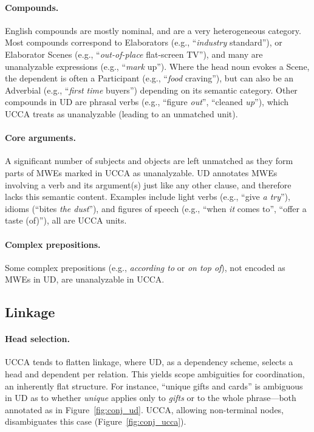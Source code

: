 \documentclass[11pt,a4paper]{article}
\begin{document}
\paragraph{Compounds.} English compounds are mostly nominal,
        and are a very heterogeneous category.
        Most compounds correspond to Elaborators (e.g., ``\textit{industry} standard''),
        or Elaborator Scenes (e.g., ``\textit{out-of-place} flat-screen TV''),
        and many are unanalyzable expressions (e.g., ``\textit{mark} up'').
        Where the head noun evokes a Scene, the dependent is often a Participant
        (e.g., ``\textit{food} craving''), but can also be an Adverbial 
        (e.g., ``\textit{first time} buyers'') depending on its semantic category.
        Other compounds in UD are phrasal verbs (e.g., ``figure \textit{out}'', ``cleaned \textit{up}''),
        which UCCA treats as unanalyzable (leading to an unmatched unit). 
            
\paragraph{Core arguments.}
      A significant number of subjects and objects are left unmatched as they
      form parts of MWEs marked in UCCA as unanalyzable. UD annotates
      MWEs involving a verb and its argument(s) just like any other clause, and therefore
      lacks this semantic content. Examples include light verbs (e.g., ``give {\it a try}''),
      idioms (``bites {\it the dust}''), and figures of speech (e.g., ``when \textit{it} comes to'', ``offer a taste (of)''),
      all are UCCA units.
      
\paragraph{Complex prepositions.} Some complex prepositions (e.g., \textit{according to} or \textit{on top of}),
      not encoded as MWEs in UD, are unanalyzable in UCCA.


\subsection{Linkage}\label{sec:linkage}

\paragraph{Head selection.}
UCCA tends to flatten linkage, where UD, as a dependency scheme,
selects a head and dependent per relation.
This yields scope ambiguities for coordination, an inherently flat structure. 
For instance, ``unique gifts and cards'' is ambiguous in UD as to whether
\textit{unique} applies only to \textit{gifts} or to the whole phrase---both
annotated as in Figure~\ref{fig:conj_ud}.
UCCA, allowing non-terminal nodes, disambiguates this case (Figure~\ref{fig:conj_ucca}).
\end{document}
